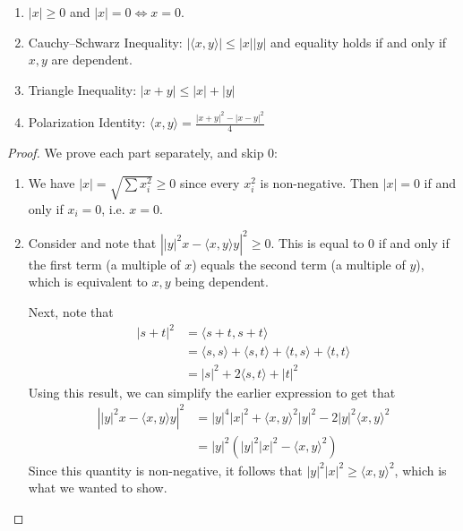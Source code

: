 \begin{itemize}
\begin{proposition}
\begin{enumerate}
                  \item $|x| \ge 0$ and $|x|=0 \iff x=0$.
                  \item Cauchy–Schwarz Inequality: $|\langle x,y\rangle| \le |x||y|$ and equality holds if and only if $x,y$ are dependent.
                  \item Triangle Inequality: $|x+y| \le |x|+|y|$
                  \item Polarization Identity: $\langle x,y\rangle = \frac{|x+y|^2-|x-y|^2}{4}$
              \end{enumerate}
          \end{proposition}
          \begin{proof}
              We prove each part separately, and skip $0$:
              \begin{enumerate}
                  \item We have $|x|=\sqrt{\sum x_i^2} \ge 0$ since every $x_i^2$ is non-negative. Then $|x|=0$ if and only if $x_i=0$, i.e. $x=0$.
                  \item Consider and note that $\left||y|^2x - \langle x,y\rangle y\right|^2 \ge 0.$ This is equal to $0$ if and only if the first term (a multiple of $x$) equals the second term (a multiple of $y$), which is equivalent to $x,y$ being dependent.

                        Next, note that
                        \begin{align}
                            |s+t|^2 & = \langle s+t, s+t\rangle                                                          \\
                                    & = \langle s,s\rangle +\langle s,t\rangle + \langle t,s\rangle + \langle t,t\rangle \\
                                    & = |s|^2 + 2\langle s,t\rangle + |t|^2
                        \end{align}
                        Using this result, we can simplify the earlier expression to get that
                        \begin{align}
                            \left||y|^2x - \langle x,y\rangle y\right|^2 & = |y|^4 |x|^2 + \langle x,y\rangle^2|y|^2 - 2|y|^2 \langle x,y\rangle^2 \\
                                                                         & = |y|^2 (|y|^2|x|^2 - \langle x,y\rangle^2)
                        \end{align}
                        Since this quantity is non-negative, it follows that $|y|^2|x|^2 \ge \langle x,y\rangle^2$, which is what we wanted to show.


\end{enumerate}
\end{proof}
\end{itemize}
